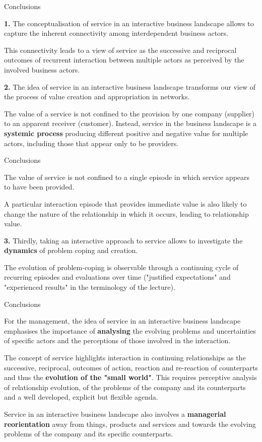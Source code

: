 \documentclass{beamer}
\begin{document}
\begin{frame}{Conclusions}

\textbf{1.} The conceptualisation of service in an interactive business
landscape allows to capture the inherent connectivity among interdependent
business actors.

This connectivity leads to a view of service as the successive and reciprocal
outcomes of recurrent interaction between multiple actors as perceived by the
involved business actors.

\textbf{2.} The idea of service in an interactive business landscape
transforms our view of the process of value creation and appropriation in
networks.

The value of a service is not conﬁned to the provision by one company
(supplier) to an apparent receiver (customer).  Instead, service in the
business landscape is a \textbf{systemic process} producing different positive
and negative value for multiple actors, including those that appear only to be
providers.
\end{frame}

\begin{frame}{Conclusions}

The value of service is not conﬁned to a single episode in which service
appears to have been provided.

A particular interaction episode that provides immediate value is also likely
to change the nature of the relationship in which it occurs, leading to
relationship value.

\textbf{3.} Thirdly, taking an interactive approach to service allows to
investigate the \textbf{dynamics} of problem coping and creation.

The evolution of problem-coping is observable through a continuing cycle of
recurring episodes and evaluations over time ("justified expectations" and
"experienced results" in the terminology of the lecture).
\end{frame}

\begin{frame}{Conclusions}

For the management, the idea of service in an interactive business landscape
emphasises the importance of \textbf{analysing} the evolving problems and
uncertainties of speciﬁc actors and the perceptions of those involved in the
interaction.

The concept of service highlights interaction in continuing relationships as
the successive, reciprocal, outcomes of action, reaction and re-reaction of
counterparts and thus the \textbf{evolution of the "small world"}.  This
requires perceptive analysis of relationship evolution, of the problems of the
company and its counterparts and a well developed, explicit but ﬂexible
agenda.

Service in an interactive business landscape also involves a
\textbf{managerial reorientation} away from things, products and services and
towards the evolving problems of the company and its speciﬁc counterparts.
\end{frame}
\end{document}

